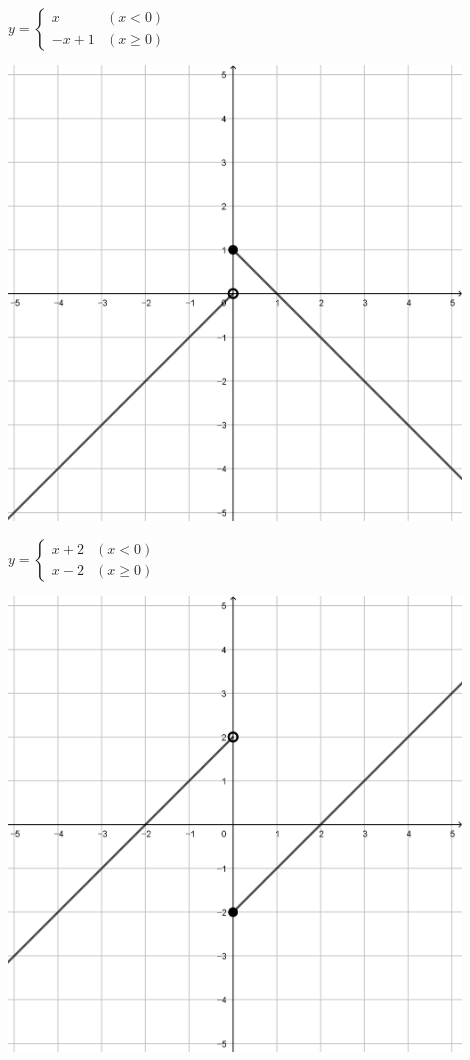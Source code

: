 \documentclass[a4paper]{oblivoir}
\begin{document}
\clearpage
\begin{minipage}{0.45\textwidth}\centering
\(y=\begin{cases}x&(x<0)\\-x+1&(x\ge0)\end{cases}\)
\par\bigskip\includegraphics[width=0.9\textwidth]{img/3_piecewise_5}
\end{minipage}
\begin{minipage}{0.45\textwidth}\centering
\(y=\begin{cases}x+2&(x<0)\\x-2&(x\ge0)\end{cases}\)
\par\bigskip\includegraphics[width=0.9\textwidth]{img/3_piecewise_6}
\end{minipage}\bigskip\bigskip\par
\end{document}
